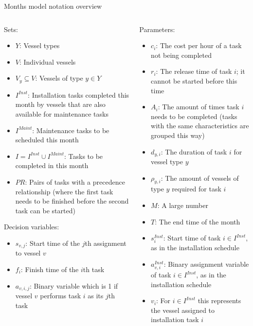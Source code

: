 \documentclass{beamer}
\newcommand{\smallc}{\scriptsize}
\begin{document}
\begin{frame}{Months model notation overview}
\smallc
\begin{columns}
\begin{column}{.48\textwidth}
Sets:
\begin{itemize}
\item $Y$: Vessel types
\item $V$: Individual vessels
\item $V_y \subseteq V$: Vessels of type $y \in Y$ 
\item $I^{Inst}$:  Installation tasks completed this month by vessels that are also available for maintenance tasks
\item $I^{Maint}$: Maintenance tasks to be scheduled this month
\item $I = I^{Inst} \cup I^{Maint}$:  Tasks to be completed in this month
\item $PR$: Pairs of tasks with a precedence relationship (where the first task needs to be finished before the second task can be started)
\end{itemize}

Decision variables:
\begin{itemize}
\item $s_{v,j}$: Start time of the $j$th assignment to vessel $v$
\item $f_i$: Finish time of the $i$th task
\item $a_{v,i,j}$: Binary variable which is 1 if vessel $v$ performs task $i$ as its $j$th task
\end{itemize}
\end{column}

\hfill

\begin{column}{.48\textwidth}
Parameters:
\begin{itemize}
\item $c_i$: The cost per hour of a task not being completed
\item $r_i$: The release time of task $i$; it cannot be started before this time
\item $A_i$: The amount of times task $i$ needs to be completed (tasks with the same characteristics are grouped this way)
\item $d_{y,i}$: The duration of task $i$ for vessel type $y$
\item $\rho_{y,i}$: The amount of vessels of type $y$ required for task $i$
\item $M$: A large number
\item $T$: The end time of the month
\item $s^{Inst}_i$: Start time of task $i \in I^{Inst}$, as in the installation schedule
\item $a^{Inst}_{v,i}$: Binary assignment variable of task $i \in I^{Inst}$, as in the installation schedule
\item $v_i$: For $i \in I^{Inst}$ this represents the vessel assigned to installation task $i$
\end{itemize}
\end{column}
\end{columns}
\end{frame}
\end{document}
